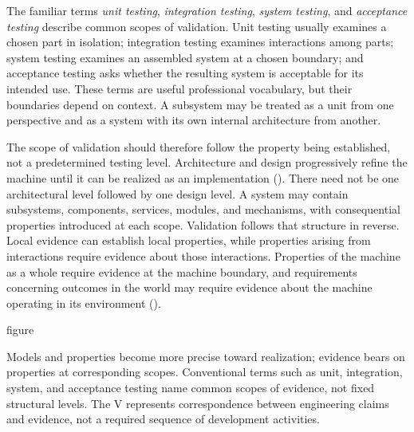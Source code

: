 The familiar terms \emph{unit testing}, \emph{integration testing}, \emph{system testing}, and \emph{acceptance
testing} describe common scopes of validation. Unit testing usually examines a chosen part in isolation;
integration testing examines interactions among parts; system testing examines an assembled system
at a chosen boundary; and acceptance testing asks whether the resulting system is acceptable for its
intended use. These terms are useful professional vocabulary, but their boundaries depend on
context. A subsystem may be treated as a unit from one perspective and as a system with its own
internal architecture from another.

The scope of validation should therefore follow the property being established, not a predetermined
testing level. Architecture and design progressively refine the machine until it can be realized as
an implementation (\citet{ch-design}). There need not be one architectural level followed by one design
level. A system may contain subsystems, components, services, modules, and mechanisms, with
consequential properties introduced at each scope. Validation follows that structure in reverse.
Local evidence can establish local properties, while properties arising from interactions require
evidence about those interactions. Properties of the machine as a whole require evidence at the
machine boundary, and requirements concerning outcomes in the world may require evidence about the
machine operating in its environment (\citet{fig-models-evidence-v}).

\begin{bookbox}{figure}{} %
\pandocbounded{}

Models and properties become more precise toward realization; evidence bears on properties at
corresponding scopes. Conventional terms such as unit, integration, system, and acceptance testing
name common scopes of evidence, not fixed structural levels. The V represents correspondence between
engineering claims and evidence, not a required sequence of development activities.
\end{bookbox}


